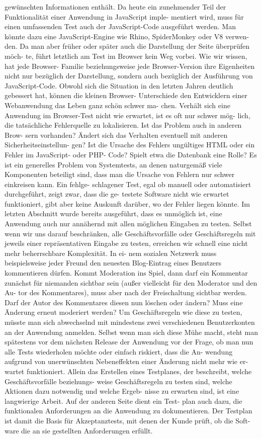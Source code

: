 gewünschten Informationen enthält.
Da heute ein zunehmender Teil der Funktionalität einer Anwendung in JavaScript imple-
mentiert wird, muss für einen umfassenden Test auch der JavaScript-Code ausgeführt werden. Man könnte dazu eine JavaScript-Engine wie Rhino, SpiderMonkey oder V8 verwen-
den. Da man aber früher oder später auch die Darstellung der Seite überprüfen möch-
te, führt letztlich am Test im Browser kein Weg vorbei. Wie wir wissen, hat jede Browser-
Familie beziehungsweise jede Browser-Version ihre Eigenheiten nicht nur bezüglich der
Darstellung, sondern auch bezüglich der Ausführung von JavaScript-Code. Obwohl sich
die Situation in den letzten Jahren deutlich gebessert hat, können die kleinen Browser-
Unterschiede den Entwicklern einer Webanwendung das Leben ganz schön schwer ma-
chen.
Verhält sich eine Anwendung im Browser-Test nicht wie erwartet, ist es oft nur schwer mög-
lich, die tatsächliche Fehlerquelle zu lokalisieren. Ist das Problem auch in anderen Brow-
sern vorhanden? Ändert sich das Verhalten eventuell mit anderen Sicherheitseinstellun-
gen? Ist die Ursache des Fehlers ungültiges HTML oder ein Fehler im JavaScript- oder PHP-
Code? Spielt etwa die Datenbank eine Rolle?
Es ist ein generelles Problem von Systemtests, an denen naturgemäß viele Komponenten
beteiligt sind, dass man die Ursache von Fehlern nur schwer einkreisen kann. Ein fehlge-
schlagener Test, egal ob manuell oder automatisiert durchgeführt, zeigt zwar, dass die ge-
testete Software nicht wie erwartet funktioniert, gibt aber keine Auskunft darüber, wo der
Fehler liegen könnte.
Im letzten Abschnitt wurde bereits ausgeführt, dass es unmöglich ist, eine Anwendung
auch nur annähernd mit allen möglichen Eingaben zu testen. Selbst wenn wir uns darauf
beschränken, alle Geschäftsvorfälle oder Geschäftsregeln mit jeweils einer repräsentativen
Eingabe zu testen, erreichen wir schnell eine nicht mehr beherrschbare Komplexität. In ei-
nem sozialen Netzwerk muss beispielsweise jeder Freund den neuesten Blog-Eintrag eines
Benutzers kommentieren dürfen. Kommt Moderation ins Spiel, dann darf ein Kommentar
zunächst für niemanden sichtbar sein (außer vielleicht für den Moderator und den Au-
tor des Kommentares), muss aber nach der Freischaltung sichtbar werden. Darf der Autor
des Kommentares diesen nun löschen oder ändern? Muss eine Änderung erneut moderiert
werden?
Um Geschäftsregeln wie diese zu testen, müsste man sich abwechselnd mit mindestens
zwei verschiedenen Benutzerkonten an der Anwendung anmelden. Selbst wenn man sich
diese Mühe macht, steht man spätestens vor dem nächsten Release der Anwendung vor
der Frage, ob man nun alle Tests wiederholen möchte oder einfach riskiert, dass die An-
wendung aufgrund von unerwünschten Nebeneffekten einer Änderung nicht mehr wie er-
wartet funktioniert.
Allein das Erstellen eines Testplanes, der beschreibt, welche Geschäftsvorfälle beziehungs-
weise Geschäftsregeln zu testen sind, welche Aktionen dazu notwendig und welche Ergeb-
nisse zu erwarten sind, ist eine langwierige Arbeit. Auf der anderen Seite dient ein Test-
plan auch dazu, die funktionalen Anforderungen an die Anwendung zu dokumentieren.
Der Testplan ist damit die Basis für Akzeptanztests, mit denen der Kunde prüft, ob die Soft-
ware die an sie gestellten Anforderungen erfüllt.

